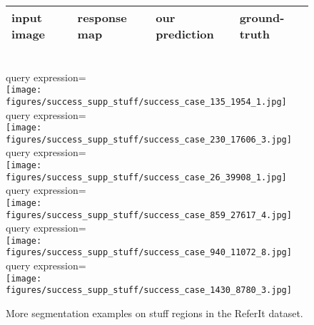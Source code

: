 \documentclass[runningheads]{llncs}
\begin{document}
\begin{figure}[t]
\centering
\begin{tabularx}{0.95\linewidth}{YYYY}
input image & response map & our prediction & ground-truth \\ \hline
\end{tabularx} \\
\small{query expression=} \\
\texttt{[image: figures/success\_supp\_stuff/success\_case\_135\_1954\_1.jpg]} \\
\small{query expression=} \\
\texttt{[image: figures/success\_supp\_stuff/success\_case\_230\_17606\_3.jpg]} \\
\small{query expression=} \\
\texttt{[image: figures/success\_supp\_stuff/success\_case\_26\_39908\_1.jpg]} \\
\small{query expression=} \\
\texttt{[image: figures/success\_supp\_stuff/success\_case\_859\_27617\_4.jpg]} \\
\small{query expression=} \\
\texttt{[image: figures/success\_supp\_stuff/success\_case\_940\_11072\_8.jpg]} \\
\small{query expression=} \\
\texttt{[image: figures/success\_supp\_stuff/success\_case\_1430\_8780\_3.jpg]} \\
\caption{More segmentation examples on stuff regions in the ReferIt dataset.}
\label{fig:sample_stuff_supp}
\end{figure}
\end{document}
